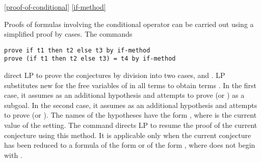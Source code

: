 \ref{proof-of-conditional}
\ref{if-method}

Proofs of formulas involving the conditional operator  can be carried
out using a simplified proof by cases.  The commands
\begin{verbatim}
prove if t1 then t2 else t3 by if-method
prove (if t1 then t2 else t3) = t4 by if-method
\end{verbatim}
direct LP to prove the conjectures by division into two cases,  and
.  LP substitutes new  for the free 
variables of  in all terms  to obtain terms .  In the
first case, it assumes  as an additional hypothesis and attempts to
prove  (or ) as a subgoal.  In the second case, it
assumes  as an additional hypothesis and attempts to prove
 (or ).  The names of the hypotheses have the form
, where  is the current value of
the  setting.
\p
The command  directs LP to resume the proof of the
current conjecture using this method.  It is applicable only when the current
conjecture has been reduced to a formula of the form 
or of the form , where  does not begin
with .

